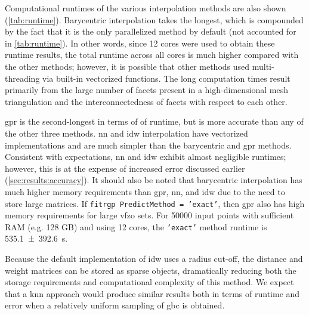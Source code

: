 \documentclass[final,twocolumn,12pt]{elsarticle}
\newcommand{\inpt}{input}
\begin{document}
Computational runtimes of the various interpolation methods are also shown (\cref{tab:runtime}). Barycentric interpolation takes the longest, which is compounded by the fact that it is the only parallelized method by default (not accounted for in \cref{tab:runtime}). In other words, since 12 cores were used to obtain these runtime results, the total runtime across all cores is much higher compared with the other methods; however, it is possible that other methods used multi-threading via built-in vectorized functions. The long computation times result primarily from the large number of facets present in a high-dimensional mesh triangulation and the interconnectedness of facets with respect to each other.

\Gls{gpr} is the second-longest in terms of of runtime, but is more accurate than any of the other three methods. \Gls{nn} and \gls{idw} interpolation have vectorized implementations and are much simpler than the barycentric and \gls{gpr} methods. Consistent with expectations, \gls{nn} and \gls{idw} exhibit almost negligible runtimes; however, this is at the expense of increased error discussed earlier (\cref{sec:results:accuracy}). It should also be noted that barycentric interpolation has much higher memory requirements than \gls{gpr}, \gls{nn}, and \gls{idw} due to the need to store large matrices. If \texttt{fitrgp PredictMethod = 'exact'}, then \gls{gpr} also has high memory requirements for large \gls{vfzo} sets. For \num{50000} input points with sufficient RAM (e.g. 128 GB) and using 12 cores, the \texttt{'exact'} method runtime is \SI{535.1 \pm 392.6}{\second}.

Because the default implementation of \gls{idw} uses a radius cut-off, the distance and weight matrices can be stored as sparse objects, dramatically reducing both the storage requirements and computational complexity of this method. We expect that a \gls{knn} approach would produce similar results both in terms of runtime and error when a relatively uniform sampling of \gls{gbc} is obtained.

\end{document}
